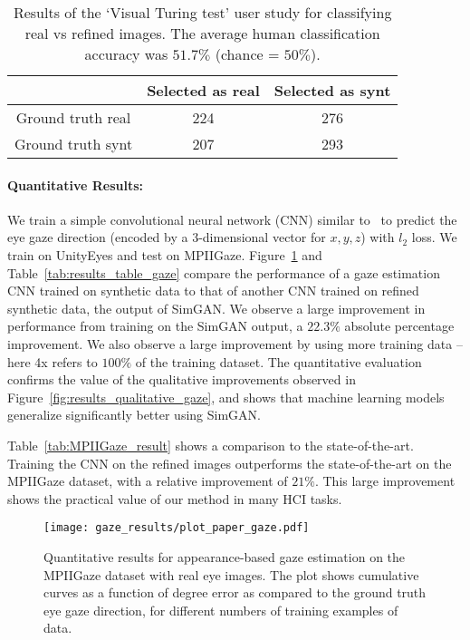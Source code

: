 \documentclass[10pt,twocolumn,letterpaper]{article}
\begin{document}
\begin{table}[t]
\centering
\begin{tabular}{|c|c|c|} \hline
&Selected as real & Selected as synt \\ \hline
Ground truth real & 224 & 276 \\ \hline
Ground truth synt & 207 & 293 \\ \hline
\end{tabular}
\caption{Results of the `Visual Turing test' user study for classifying  real vs  refined images.
The average human classification accuracy was $51.7\%$ (chance = $50\%$). 
}
\label{tab:results_gaze_turing}
\end{table}





\vspace{-0.2in}
\paragraph{Quantitative Results:}
We train a simple convolutional neural network (CNN) similar to~\cite{Zhang15a} to predict the eye gaze direction (encoded by a 3-dimensional vector for $x,y,z$) with $l_2$ loss. We train on UnityEyes and test on MPIIGaze.
Figure~\ref{fig:results_plots_gaze} and Table~\ref{tab:results_table_gaze} compare the performance of a gaze estimation CNN trained on synthetic data to that of another CNN trained on refined synthetic data, the output of SimGAN. 
We observe a large improvement in performance from training on the SimGAN output, a $22.3\%$ absolute percentage improvement. 
We also observe a large improvement by using more training data -- here 4x refers to $100\%$ of the training dataset.
The quantitative evaluation confirms the value of the qualitative improvements observed in Figure~\ref{fig:results_qualitative_gaze}, and shows that machine learning models generalize significantly better using SimGAN.

Table~\ref{tab:MPIIGaze_result} shows a comparison to the state-of-the-art.
Training the CNN on the refined images outperforms the state-of-the-art on the MPIIGaze dataset, with a relative improvement of $21\%$.
This large improvement shows the practical value of our method in many HCI tasks.







\begin{figure}
\centering
\texttt{[image: gaze\_results/plot\_paper\_gaze.pdf]} 
\caption{Quantitative results for appearance-based gaze estimation on the MPIIGaze dataset with real eye images.  
The plot shows cumulative curves as a function of degree error as compared to the ground truth eye gaze direction, for different numbers of training examples of data.
}
\label{fig:results_plots_gaze}
\end{figure}
\end{document}
